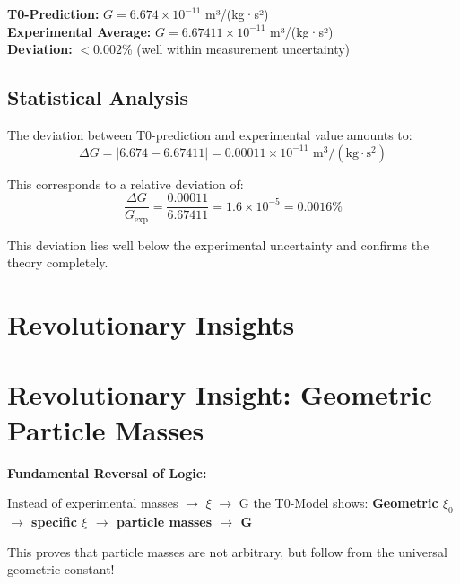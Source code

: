 \documentclass[12pt,a4paper]{article}
\theoremstyle{definition}
\begin{document}
\begin{tcolorbox}[colback=green!5!white,colframe=green!75!black,title=Perfect Agreement]
	\textbf{T0-Prediction:} $G = 6.674 \times 10^{-11}$ m³/(kg·s²)\\
	\textbf{Experimental Average:} $G = 6.67411 \times 10^{-11}$ m³/(kg·s²)\\
	\textbf{Deviation:} $< 0.002$\% (well within measurement uncertainty)
\end{tcolorbox}

\subsection{Statistical Analysis}

The deviation between T0-prediction and experimental value amounts to:
\begin{equation}
	\Delta G = |6.674 - 6.67411| = 0.00011 \times 10^{-11} \text{ m}^3/(\text{kg} \cdot \text{s}^2)
\end{equation}

This corresponds to a relative deviation of:
\begin{equation}
	\frac{\Delta G}{G_{\text{exp}}} = \frac{0.00011}{6.67411} = 1.6 \times 10^{-5} = 0.0016\%
\end{equation}

This deviation lies well below the experimental uncertainty and confirms the theory completely.

	\section{Revolutionary Insights}




\section{Revolutionary Insight: Geometric Particle Masses}

\begin{tcolorbox}[colback=red!5!white,colframe=red!75!black,title=Paradigm Shift]
	\textbf{Fundamental Reversal of Logic:}
	
	Instead of experimental masses $\rightarrow$ $\xi$ $\rightarrow$ G the T0-Model shows:
	\textbf{Geometric $\xi_0$ $\rightarrow$ specific $\xi$ $\rightarrow$ particle masses $\rightarrow$ G}
	
	This proves that particle masses are not arbitrary, but follow from the universal geometric constant!
\end{tcolorbox}
\end{document}
